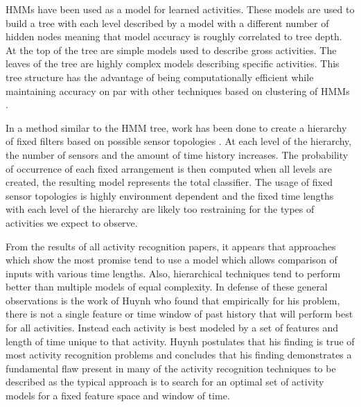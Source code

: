 HMMs have been used as a model for learned activities.  These models are used to build a tree \cite{Minnen2004, Wren2006a} with each level described by a model with a different number of hidden nodes meaning that model accuracy is roughly correlated to tree depth.  At the top of the tree are simple models used to describe gross activities.  The leaves of the tree are highly complex models describing specific activities.  This tree structure has the advantage of being computationally efficient while maintaining accuracy on par with other techniques based on clustering of HMMs \cite{Clarkson1999}.  
	
In a method similar to the HMM tree, work has been done to create a hierarchy of fixed filters based on possible sensor topologies \cite{Wren2006}.  At each level of the hierarchy, the number of sensors and the amount of time history increases.  The probability of occurrence of each fixed arrangement is then computed when all levels are created, the resulting model represents the total classifier.  The usage of fixed sensor topologies is highly environment dependent and the fixed time lengths with each level of the hierarchy are likely too restraining for the types of activities we expect to observe.  

From the results of all activity recognition papers, it appears that approaches which show the most promise tend to use a model which allows comparison of inputs with various time lengths.  Also, hierarchical techniques tend to perform better than multiple models of equal complexity.  In defense of these general observations is the work of Huynh \cite{Huynh2005} who found that empirically for his problem, there is not a single feature or time window of past history that will perform best for all activities.  Instead each activity is best modeled by a set of features and length of time unique to that activity.  Huynh postulates that his finding is true of most activity recognition problems and concludes that his finding demonstrates a fundamental flaw present in many of the activity recognition techniques to be described as the typical approach is to search for an optimal set of activity models for a fixed feature space and window of time.
